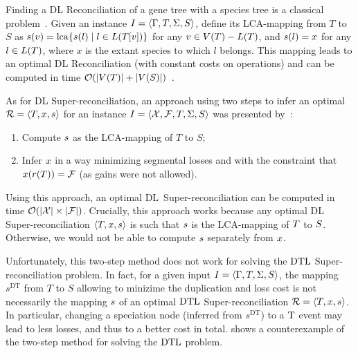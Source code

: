 Finding a DL Reconciliation of a gene tree with a species tree is a classical
problem~\parencite{Fitch1970DistinguishingHomologousAnalogous,Goodman1979FittingGeneLineage,Guigo1996ReconstructionAncientMolecular,Page1994MapsTreesCladistic}.
Given an instance \(I = \left\langle\Gamma, T, \Sigma, S\right\rangle\), define its LCA-mapping from \(T\) to \(S\) as \(s(v) = \mathrm{lca}\{s(l) \mid l \in L(T[v])\}\) for any \(v \in V(T) - L(T)\), and \(s(l) = x\) for any \(l \in L(T)\), where \(x\) is the extant species to which \(l\) belongs.
This mapping leads to an optimal DL Reconciliation (with constant costs on operations) and  can be computed in time \(\mathcal{O}(|V(T)| + |V(S)|)\)~\parencite{Gorecki2006DlsTreesModel}.

As for DL Super-reconciliation, an approach using two steps to infer an optimal \(\mathcal{R} = \left\langle T, x, s\right\rangle\) for an instance \(I = \left\langle\mathcal{X}, \mathcal{F}, T, \Sigma, S\right\rangle\) was presented by~\textcite{Delabre2020EvolutionSegmentalDuplications}:
\begin{enumerate}
    \item Compute \(s\) as the LCA-mapping of \(T\) to \(S\);
    \item Infer \(x\) in a way minimizing segmental losses and with the constraint that \(x(r(T)) = \mathcal{F}\) (as gains were not allowed).
\end{enumerate}

Using this approach, an optimal DL~Super-reconciliation can be computed in time \(\operatorname{\mathcal{O}}(|\mathcal{X}| \times |\mathcal{F}|)\).
Crucially, this approach works because any optimal DL Super-reconciliation \(\left\langle T, x, s\right\rangle\) is such that \(s\) is the LCA-mapping of \(T\) to \(S\).
Otherwise, we would not be able to compute \(s\) separately from \(x\).

Unfortunately, this two-step method does not work for solving the \(\mathrm{DTL}\) Super-reconciliation problem.
In fact, for a given input \(I = \left\langle\Gamma, T, \Sigma, S\right\rangle\), the mapping \(s^{\mathrm{DT}}\) from \(T\) to \(S\) allowing to minizime the duplication and loss cost is not necessarily the mapping \(s\) of an optimal \(\mathrm{DTL}\) Super-reconciliation \(\mathcal{R} = \left\langle T, x, s\right\rangle\).
In particular, changing a speciation node (inferred from \(s^{\mathrm{DT}}\)) to a \(\mathrm{T}\) event may lead to less losses, and thus to a better cost in total.
 shows a counterexample of the two-step method for solving the \(\mathrm{DTL}\) problem.


